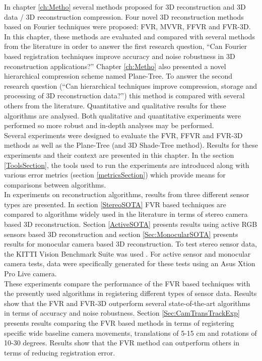 
In chapter \ref{ch:Metho} several methods proposed for 3D reconstruction and 3D data / 3D reconstruction compression. Four novel 3D reconstruction methods based on Fourier techniques were proposed: FVR, MVVR, FFVR and FVR-3D. In this chapter, these methods are evaluated and compared with several methods from the literature in order to answer the first research question, ``Can Fourier based registration techniques improve accuracy and noise robustness in 3D reconstruction applications?'' Chapter \ref{ch:Metho} also presented a novel hierarchical compression scheme named Plane-Tree. To answer the second research question (``Can hierarchical techniques improve compression, storage and processing of 3D reconstruction data?'') this method is compared with several others from the literature. Quantitative and qualitative results for these algorithms are analysed. Both qualitative and quantitative experiments were performed so more robust and in-depth analyses may be performed. \\

Several experiments were designed to evaluate the FVR, FFVR and FVR-3D methods as well as the Plane-Tree (and 3D Shade-Tree method). Results for these experiments and their context are presented in this chapter. In the section \ref{ToolsSection}, the tools used to run the experiments are introduced along with various error metrics (section \ref{metricsSection}) which provide means for comparisons between algorithms. \\

In experiments on reconstruction algorithms, results from three different sensor types are presented. In section \ref{StereoSOTA} FVR based techniques are compared to algorithms widely used in the literature in terms of stereo camera based 3D reconstruction. Section \ref{ActiveSOTA} presents results using active RGB sensors based 3D reconstruction and section \ref{Sec:MonocularSOTA} presents results for monocular camera based 3D reconstruction. To test stereo sensor data, the KITTI Vision Benchmark Suite was used \cite{Geiger13Vision}. For active sensor and monocular camera tests, data were specifically generated for these tests using an Asus Xtion Pro Live camera. \\

These experiments compare the performance of the FVR based techniques with the presently used algorithms in registering different types of sensor data. Results show that the FVR and FVR-3D outperform several state-of-the-art algorithms in terms of accuracy and noise robustness. Section \ref{Sec:CamTransTrackExp} presents results comparing the FVR based methods in terms of registering specific wide baseline camera movements, translations of 5-15 cm and rotations of 10-30 degrees. Results show that the FVR method can outperform others in terms of reducing registration error. \\

